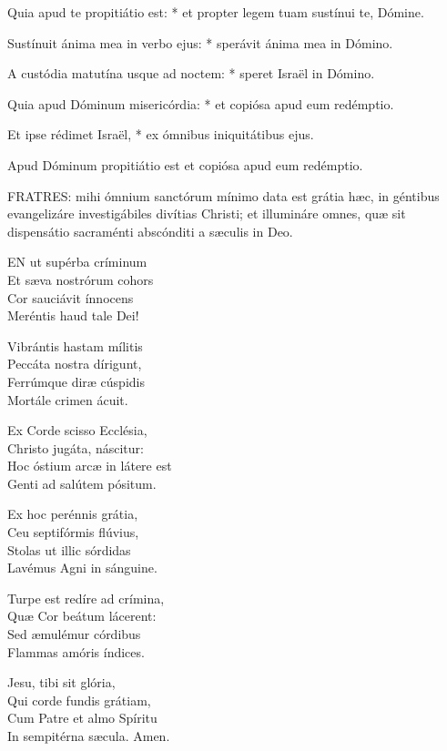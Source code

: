Quia apud te propitiátio est: * et propter legem tuam sustínui te, Dómine.

Sustínuit ánima mea in verbo ejus: * sperávit ánima mea in Dómino.

A custódia matutína usque ad noctem: * speret Israël in Dómino.

Quia apud Dóminum misericórdia: * et copiósa apud eum redémptio.

Et ipse rédimet Israël, * ex ómnibus iniquitátibus ejus.

 Apud Dóminum propitiátio est et copiósa apud eum redémptio.


\lettrine[lines=2]{F}{RATRES}: mihi ómnium sanctórum mínimo data est grátia hæc, in géntibus evangelizáre investigábiles divítias Christi; et illumináre omnes, quæ sit dispensátio sacraménti abscónditi a sæculis in Deo.


\lettrine[lines=2]{E}{N} ut supérba críminum\\
Et sæva nostrórum cohors\\
Cor sauciávit ínnocens\\
Meréntis haud tale Dei!

Vibrántis hastam mílitis\\
Peccáta nostra dírigunt,\\
Ferrúmque diræ cúspidis\\
Mortále crimen ácuit.

Ex Corde scisso Ecclésia,\\
Christo jugáta, náscitur:\\
Hoc óstium arcæ in látere est\\
Genti ad salútem pósitum.

Ex hoc perénnis grátia,\\
Ceu septifórmis flúvius,\\
Stolas ut illic sórdidas\\
Lavémus Agni in sánguine.

Turpe est redíre ad crímina,\\
Quæ Cor beátum lácerent:\\
Sed æmulémur córdibus\\
Flammas amóris índices.


Jesu, tibi sit glória,\\
Qui corde fundis grátiam,\\
Cum Patre et almo Spíritu\\
In sempitérna sæcula. Amen.

